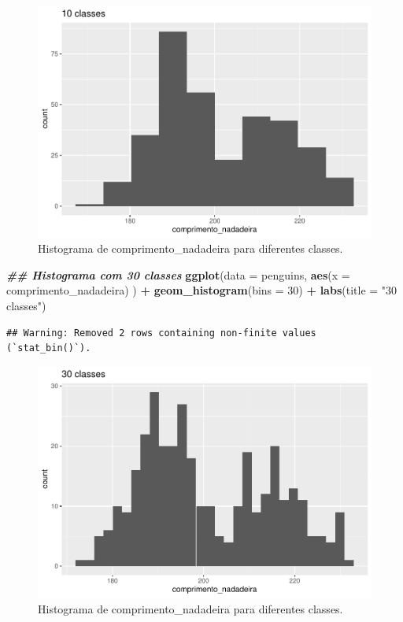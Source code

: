\documentclass[
]{article}
\newenvironment{Shaded}{\begin{snugshade}}{\end{snugshade}}
\newcommand{\AttributeTok}[1]{\textcolor[rgb]{0.13,0.29,0.53}{#1}}
\newcommand{\DecValTok}[1]{\textcolor[rgb]{0.00,0.00,0.81}{#1}}
\newcommand{\DocumentationTok}[1]{\textcolor[rgb]{0.56,0.35,0.01}{\textbf{\textit{#1}}}}
\newcommand{\FunctionTok}[1]{\textcolor[rgb]{0.13,0.29,0.53}{\textbf{#1}}}
\newcommand{\NormalTok}[1]{#1}
\newcommand{\SpecialCharTok}[1]{\textcolor[rgb]{0.81,0.36,0.00}{\textbf{#1}}}
\newcommand{\StringTok}[1]{\textcolor[rgb]{0.31,0.60,0.02}{#1}}
\begin{document}
\begin{figure}
\includegraphics[width=0.75\linewidth,height=0.75\textheight]{epr_files/figure-latex/fig-hist-bins-1} \caption{Histograma de comprimento_nadadeira para diferentes classes.}\label{fig:fig-hist-bins-1}
\end{figure}

\begin{Shaded}
\begin{Highlighting}[]
\DocumentationTok{\#\# Histograma com 30 classes}
\FunctionTok{ggplot}\NormalTok{(}\AttributeTok{data =}\NormalTok{ penguins, }
       \FunctionTok{aes}\NormalTok{(}\AttributeTok{x =}\NormalTok{ comprimento\_nadadeira)}
\NormalTok{       ) }\SpecialCharTok{+}
    \FunctionTok{geom\_histogram}\NormalTok{(}\AttributeTok{bins =} \DecValTok{30}\NormalTok{) }\SpecialCharTok{+}
    \FunctionTok{labs}\NormalTok{(}\AttributeTok{title =} \StringTok{"30 classes"}\NormalTok{)}
\end{Highlighting}
\end{Shaded}

\begin{verbatim}
## Warning: Removed 2 rows containing non-finite values (`stat_bin()`).
\end{verbatim}

\begin{figure}
\includegraphics[width=0.75\linewidth,height=0.75\textheight]{epr_files/figure-latex/fig-hist-bins-2} \caption{Histograma de comprimento_nadadeira para diferentes classes.}\label{fig:fig-hist-bins-2}
\end{figure}
\end{document}
